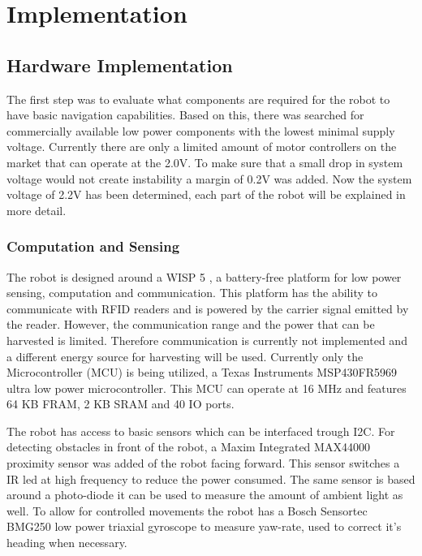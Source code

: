 \chapter{Implementation}


\section{Hardware Implementation}


The first step was to evaluate what components are required for the robot to have basic navigation capabilities.
Based on this, there was searched for commercially available low power components with the lowest minimal supply voltage.
Currently there are only a limited amount of motor controllers on the market that can operate at the 2.0V.
To make sure that a small drop in system voltage would not create instability a margin of 0.2V was added.
Now the system voltage of 2.2V has been determined, each part of the robot will be explained in more detail. 

\subsection{Computation and Sensing}

The robot is designed around a WISP 5 \cite{wisp5_wiki_2017}, a battery-free platform for low power sensing, computation and communication.
This platform has the ability to communicate with RFID readers and is powered by the carrier signal emitted by the reader.
However, the communication range and the power that can be harvested is limited.
Therefore communication is currently not implemented and a different energy source for harvesting will be used.
Currently only the Microcontroller (MCU) is being utilized, a Texas Instruments MSP430FR5969 ultra low power microcontroller.
This MCU can operate at 16 MHz and features 64 KB FRAM, 2 KB SRAM and 40 IO ports.

The robot has access to basic sensors which can be interfaced trough I2C.
For detecting obstacles in front of the robot, a Maxim Integrated MAX44000 proximity sensor was added of the robot facing forward.
This sensor switches a IR led at high frequency to reduce the power consumed.
The same sensor is based around a photo-diode it can be used to measure the amount of ambient light as well.
To allow for controlled movements the robot has a Bosch Sensortec BMG250 low power triaxial gyroscope to measure yaw-rate, used to correct it's heading when necessary.

